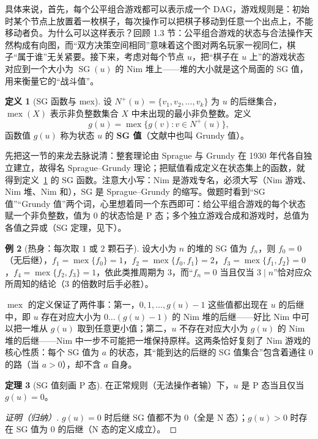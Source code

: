 \documentclass[UTF8,a4paper,11pt,oneside,openany,fontset=fandol]{ctexbook}
\theoremstyle{definition}
\newtheorem{definition}{定义}[chapter]
\newtheorem{theorem}[definition]{定理}
\newtheorem{example}[definition]{例}
\newcommand{\mex}{\operatorname{mex}}
\newcommand{\SG}{\operatorname{SG}}
\newcommand{\Np}{N^+}
\begin{document}
具体来说，首先，每个公平组合游戏都可以表示成一个 DAG，游戏规则是：初始时某个节点上放置着一枚棋子，每次操作可以把棋子移动到任意一个出点上，不能移动者负。为什么可以这样表示？回顾 1.3 节：公平组合游戏的状态与合法操作天然构成有向图，而“双方决策空间相同”意味着这个图对两名玩家一视同仁，棋子“属于谁”无关紧要。接下来，考虑对每个节点 $u$，把“棋子在 $u$ 上”的游戏状态对应到一个大小为 $\SG(u)$ 的 Nim 堆上——堆的大小就是这个局面的 SG 值，用来衡量它的“战斗值”。

\begin{definition}[SG 函数与 mex]\label{def:sg}
设 $\Np(u)=\{v_1,v_2,\ldots,v_k\}$ 为 $u$ 的后继集合，$\mex(X)$ 表示非负整数集合 $X$ 中未出现的最小非负整数。定义
\[
 g(u)=\mex\{g(v):v\in\Np(u)\},
\]
函数值 $g(u)$ 称为状态 $u$ 的 \textbf{SG 值}（文献中也叫 Grundy 值）。
\end{definition}

先把这一节的来龙去脉说清：整套理论由 Sprague 与 Grundy 在 1930 年代各自独立建立，故得名 Sprague--Grundy 理论；把赋值看成定义在状态集上的函数，就得到定义~\ref{def:sg} 的 SG 函数。注意大小写：Nim 是游戏专名，必须大写（Nim 游戏、Nim 堆、Nim 和），SG 是 Sprague--Grundy 的缩写。做题时看到“SG 值”“Grundy 值”两个词，心里想着同一个东西即可：给公平组合游戏的每个状态赋一个非负整数，值为 $0$ 的状态恰是 P 态；多个独立游戏合成和游戏时，总值为各值之异或（SG 定理，见下）。

\begin{example}[热身：每次取 $1$ 或 $2$ 颗石子]
设大小为 $n$ 的堆的 SG 值为 $f_n$，则 $f_0=0$（无后继），$f_1=\mex\{f_0\}=1$，$f_2=\mex\{f_0,f_1\}=2$，$f_3=\mex\{f_1,f_2\}=0$，$f_4=\mex\{f_2,f_3\}=1$，依此类推周期为 $3$，而“$f_n=0$ 当且仅当 $3\mid n$”恰对应众所周知的结论（$3$ 的倍数时后手必胜）。
\end{example}

$\mex$ 的定义保证了两件事：第一，$0,1,\ldots,g(u)-1$ 这些值都出现在 $u$ 的后继中，即 $u$ 存在对应大小为 $0\ldots(g(u)-1)$ 的 Nim 堆的后继——好比 Nim 中可以把一堆从 $g(u)$ 取到任意更小值；第二，$u$ 不存在对应大小为 $g(u)$ 的 Nim 堆的后继——Nim 中一步不可能把一堆保持原样。这两条恰好复刻了 Nim 游戏的核心性质：每个 SG 值为 $a$ 的状态，其“能到达的后继的 SG 值集合”包含着通往 $0$ 的路（当 $a>0$），却不含 $a$ 自身。

\begin{theorem}[SG 值刻画 P 态]\label{thm:sgzero}
在正常规则（无法操作者输）下，$u$ 是 P 态当且仅当 $g(u)=0$。
\end{theorem}
\begin{proof}[证明（归纳）]
$g(u)=0$ 时后继 SG 值都不为 $0$（全是 N 态）；$g(u)>0$ 时存在 SG 值为 $0$ 的后继（N 态的定义成立）。
\end{proof}
\end{document}
